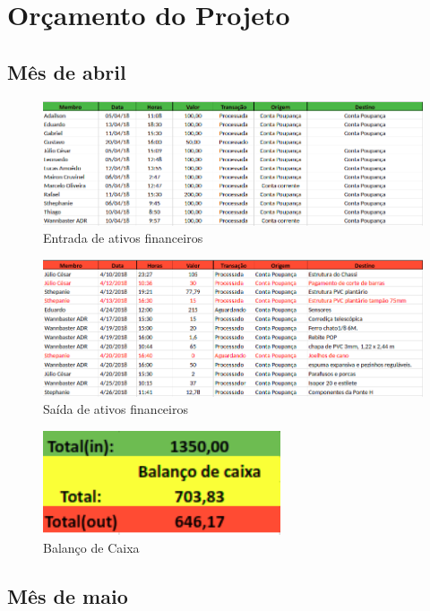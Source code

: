 \chapter[Orçamento do Projeto]{Orçamento do Projeto}

\section{Mês de abril}
\begin{figure}[H]
	\centering
	\includegraphics[width=17cm]{figuras/entrada_ativos.png}
	\caption{Entrada de ativos financeiros} \label{entrada_ativos}
\end{figure}

\begin{figure}[H]
	\centering
	\includegraphics[width=17cm]{figuras/saida_ativos.png}
	\caption{Saída de ativos financeiros} \label{saida_ativos}
\end{figure}

\begin{figure}[H]
	\centering
	\includegraphics[width=7cm]{figuras/balanco_abril.png}
	\caption{Balanço de Caixa} \label{balanco_abril}
\end{figure}

\section{Mês de maio}

